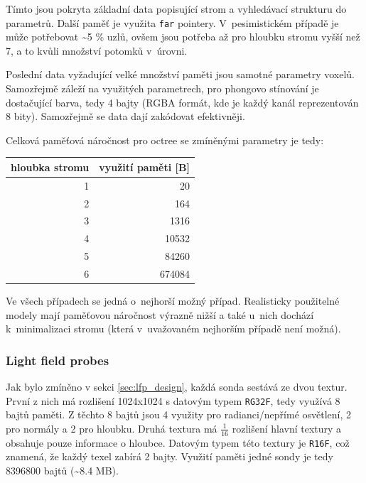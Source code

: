 Tímto jsou pokryta základní data popisující strom a vyhledávací strukturu do parametrů. Další paměť je využita \texttt{far} pointery. V~pesimistickém případě je může potřebovat \textasciitilde5 \% uzlů, ovšem jsou potřeba až pro hloubku stromu vyšší než 7, a to kvůli množství potomků v~úrovni.

Poslední data vyžadující velké množství paměti jsou samotné parametry voxelů. Samozřejmě záleží na využitých parametrech, pro phongovo stínování je dostačující barva, tedy 4 bajty (RGBA formát, kde je každý kanál reprezentován 8 bity). Samozřejmě se data dají zakódovat efektivněji.

Celková paměťová náročnost pro octree se zmíněnými parametry je tedy:

\begin{table}[H]
	\centering
	\begin{tabular}{|r|r|}
		\hline
		\multicolumn{1}{|c|}{hloubka stromu} & \multicolumn{1}{c|}{využití paměti {[}B{]}} \\ \hline
		1                                    & 20                                          \\ \hline
		2                                    & 164                                         \\ \hline
		3                                    & 1316                                        \\ \hline
		4                                    & 10532                                       \\ \hline
		5                                    & 84260                                       \\ \hline
		6                                    & 674084                                      \\ \hline
	\end{tabular}
	\captionsetup{justification=centering}
\end{table}

Ve všech případech se jedná o~nejhorší možný případ. Realisticky použitelné modely mají paměťovou náročnost výrazně nižší a také u~nich dochází k~minimalizaci stromu (která v~uvažovaném nejhorším případě není možná).


\subsubsection{Light field probes}
Jak bylo zmíněno v sekci \ref{sec:lfp_design}, každá sonda sestává ze dvou textur. První z nich má rozlišení 1024x1024 s datovým typem \texttt{RG32F}, tedy využívá 8 bajtů paměti. Z těchto 8 bajtů jsou 4 využity pro radianci/nepřímé osvětlení, 2 pro normály a 2 pro hloubku. Druhá textura má $\frac{1}{16}$ rozlišení hlavní textury a obsahuje pouze informace o hloubce. Datovým typem této textury je \texttt{R16F}, což znamená, že každý texel zabírá 2 bajty. Využití paměti jedné sondy je tedy 8396800 bajtů (\textasciitilde{}8.4 MB).

